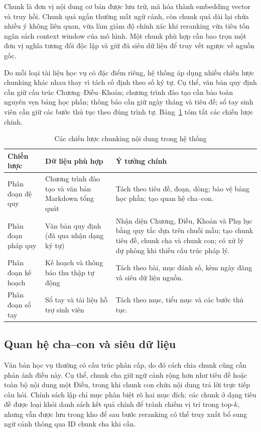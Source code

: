 \documentclass[../DoAn.tex]{subfiles}
\begin{document}
Chunk là đơn vị nội dung cơ bản được lưu trữ, mã hóa thành embedding vector và
truy hồi. Chunk quá ngắn thường mất ngữ cảnh, còn chunk quá dài lại chứa nhiều
ý không liên quan, vừa làm giảm độ chính xác khi reranking vừa tiêu tốn ngân
sách context window của mô hình. Một chunk phù hợp cần bao trọn một đơn vị
nghĩa tương đối độc lập và giữ đủ siêu dữ liệu để truy vết ngược về nguồn gốc.

Do mỗi loại tài liệu học vụ có đặc điểm riêng, hệ thống áp dụng nhiều chiến
lược chunking khác nhau thay vì tách cố định theo số ký tự. Cụ thể, văn bản
quy định cần giữ cấu trúc Chương--Điều--Khoản; chương trình đào tạo cần bảo
toàn nguyên vẹn bảng học phần; thông báo cần giữ ngày tháng và tiêu đề; sổ tay
sinh viên cần giữ các bước thủ tục theo đúng trình tự.
Bảng~\ref{tab:chunking_strategies} tóm tắt các chiến lược chính.

\begin{table}[H]
\centering
\begin{tabular}{|l|p{4.0cm}|p{6.0cm}|}
\hline
\textbf{Chiến lược} & \textbf{Dữ liệu phù hợp} & \textbf{Ý tưởng chính} \\
\hline
Phân đoạn đệ quy & Chương trình đào tạo và văn bản Markdown tổng quát &
Tách theo tiêu đề, đoạn, dòng; bảo vệ bảng học phần; tạo quan hệ cha--con. \\
\hline
Phân đoạn pháp quy & Văn bản quy định (đã qua nhận dạng ký tự) & Nhận diện
Chương, Điều, Khoản và Phụ lục bằng quy tắc dựa trên chuỗi mẫu; tạo chunk
tiêu đề, chunk cha và chunk con; có xử lý dự phòng khi thiếu cấu trúc pháp lý. \\
\hline
Phân đoạn kế hoạch & Kế hoạch và thông báo thu thập tự động & Tách theo bài,
mục đánh số, kèm ngày đăng và siêu dữ liệu nguồn. \\
\hline
Phân đoạn sổ tay & Sổ tay và tài liệu hỗ trợ sinh viên & Tách theo mục, tiểu
mục và các bước thủ tục. \\
\hline
\end{tabular}
\caption{Các chiến lược chunking nội dung trong hệ thống}
\label{tab:chunking_strategies}
\end{table}

\subsection{Quan hệ cha--con và siêu dữ liệu}

Văn bản học vụ thường có cấu trúc phân cấp, do đó cách chia chunk cũng cần
phản ánh điều này. Cụ thể, chunk cha giữ ngữ cảnh rộng hơn như tiêu đề hoặc
toàn bộ nội dung một Điều, trong khi chunk con chứa nội dung trả lời trực tiếp
câu hỏi. Chính sách lập chỉ mục phân biệt rõ hai mục đích: các chunk ở dạng
tiêu đề được loại khỏi danh sách kết quả chính để tránh chiếm vị trí trong
top-$k$, nhưng vẫn được lưu trong kho để sau bước reranking có thể truy xuất
bổ sung ngữ cảnh thông qua ID chunk cha khi cần.
\end{document}
